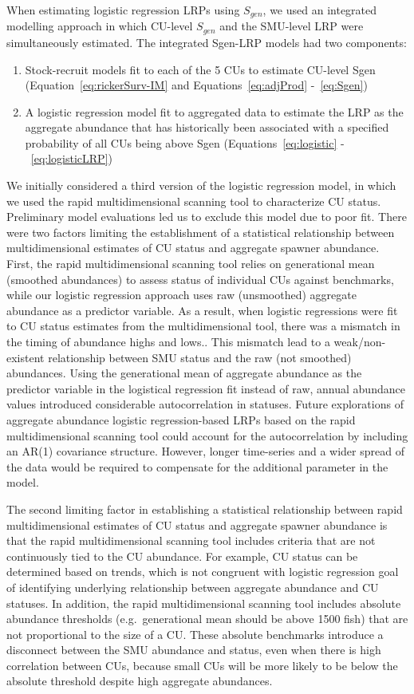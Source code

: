\documentclass[11pt]{book}
\begin{document}
When estimating logistic regression LRPs using \(S_{gen}\), we used an integrated modelling approach in which CU-level \(S_{gen}\) and the SMU-level LRP were simultaneously estimated. The integrated Sgen-LRP models had two components:
\begin{enumerate}
\def\labelenumi{(\roman{enumi})}
\item
  Stock-recruit models fit to each of the 5 CUs to estimate CU-level Sgen (Equation~\ref{eq:rickerSurv-IM} and Equations~\ref{eq:adjProd} -~\ref{eq:Sgen})
\item
  A logistic regression model fit to aggregated data to estimate the LRP as the aggregate abundance that has historically been associated with a specified probability of all CUs being above Sgen (Equations~\ref{eq:logistic} -~\ref{eq:logisticLRP})
\end{enumerate}
We initially considered a third version of the logistic regression model, in which we used the rapid multidimensional scanning tool to characterize CU status. Preliminary model evaluations led us to exclude this model due to poor fit. There were two factors limiting the establishment of a statistical relationship between multidimensional estimates of CU status and aggregate spawner abundance. First, the rapid multidimensional scanning tool relies on generational mean (smoothed abundances) to assess status of individual CUs against benchmarks, while our logistic regression approach uses raw (unsmoothed) aggregate abundance as a predictor variable. As a result, when logistic regressions were fit to CU status estimates from the multidimensional tool, there was a mismatch in the timing of abundance highs and lows.. This mismatch lead to a weak/non-existent relationship between SMU status and the raw (not smoothed) abundances. Using the generational mean of aggregate abundance as the predictor variable in the logistical regression fit instead of raw, annual abundance values introduced considerable autocorrelation in statuses. Future explorations of aggregate abundance logistic regression-based LRPs based on the rapid multidimensional scanning tool could account for the autocorrelation by including an AR(1) covariance structure. However, longer time-series and a wider spread of the data would be required to compensate for the additional parameter in the model.

The second limiting factor in establishing a statistical relationship between rapid multidimensional estimates of CU status and aggregate spawner abundance is that the rapid multidimensional scanning tool includes criteria that are not continuously tied to the CU abundance. For example, CU status can be determined based on trends, which is not congruent with logistic regression goal of identifying underlying relationship between aggregate abundance and CU statuses. In addition, the rapid multidimensional scanning tool includes absolute abundance thresholds (e.g.~generational mean should be above 1500 fish) that are not proportional to the size of a CU. These absolute benchmarks introduce a disconnect between the SMU abundance and status, even when there is high correlation between CUs, because small CUs will be more likely to be below the absolute threshold despite high aggregate abundances.
\end{document}
